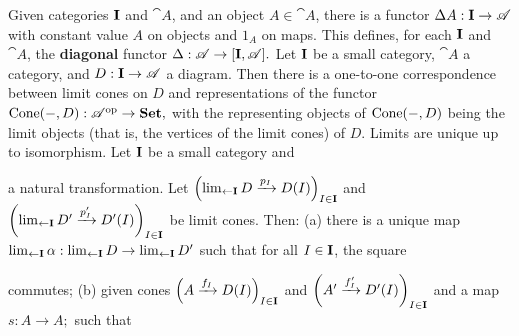 Given categories $\mathbf{I}$ and $\cat A$, and an object $A \in \cat{A}$, there is a functor $\Delta A: \mathbf{I} \to \mathscr{A}$ with constant value $A$ on objects and $1_A$ on maps. This defines, for each $\mathbf{I}$ and $\cat A$, the \textbf{diagonal} functor 
$\Delta : \mathscr{A} \to [\mathbf{I}, \mathscr{A}].$
 Let $\mathbf{I}$ be a small category, $\cat A$ a category, and $D: \mathbf{I} \to \mathscr{A}$ a diagram. Then there is a one-to-one correspondence between limit cones on $D$ and representations of the functor 
$\operatorname{Cone}(-,D): \mathscr{A}^{\operatorname{op}} \to \operatorname{\mathbf{Set}},$
with the representing objects of $\operatorname{Cone}(-,D)$ being the limit objects (that is, the vertices of the limit cones) of $D$.
 Limits are unique up to isomorphism.
 Let $\mathbf{I}$ be a small category and %
 a natural transformation. Let 
$\Bigl(\lim_{\leftarrow \mathbf{I}} D \xrightarrow[]{p_I} D(I)\Bigr)_{I \in \mathbf{I}}$ and $\left(\lim_{\leftarrow \mathbf{I}} D' \xrightarrow[]{p'_I} D'(I)\right)_{I \in \mathbf{I}}$ be limit cones. Then:
(a) there is a unique map $\operatorname{\lim_{\leftarrow \mathbf{I}}}\alpha: \operatorname{\lim_{\leftarrow \mathbf{I}}} D \to \operatorname{\lim_{\leftarrow \mathbf{I}}} D'$ such that for all $I \in \mathbf{I}$, the square %
 commutes;
(b) given cones $\left( A \xrightarrow[]{f_I} D(I)\right)_{I \in \mathbf{I}}$  and $\left( A' \xrightarrow[]{f'_I} D'(I)\right)_{I \in \mathbf{I}}$ and a map $s : A \to A;$ such that %
